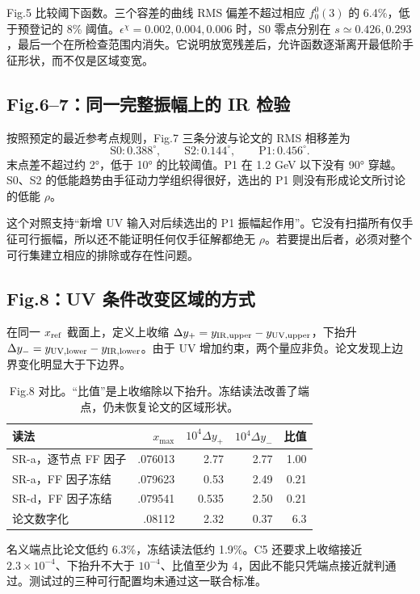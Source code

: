 \documentclass[UTF8,a4paper,11pt,fontset=fandol]{ctexart}
\numberwithin{equation}{section}
\newcommand{\eChi}{\epsilon^{\chi}}
\begin{document}
Fig.5 比较阈下函数。三个容差的曲线 RMS 偏差不超过相应 \(f_0^0(3)\) 的 6.4\%，低于预登记的 8\% 阈值。\(\eChi=0.002,0.004,0.006\) 时，S0 零点分别在 \(s\simeq0.426,0.293\)，最后一个在所检查范围内消失。它说明放宽残差后，允许函数逐渐离开最低阶手征形状，而不仅是区域变宽。

\subsection{Fig.6--7：同一完整振幅上的 IR 检验}
按照预定的最近参考点规则，Fig.7 三条分波与论文的 RMS 相移差为
\begin{equation}
\mathrm{S0}:0.388^\circ,\qquad
\mathrm{S2}:0.144^\circ,\qquad
\mathrm{P1}:0.456^\circ.
\end{equation}
末点差不超过约 2°，低于 10° 的比较阈值。P1 在 1.2 GeV 以下没有 90° 穿越。S0、S2 的低能趋势由手征动力学组织得很好，选出的 P1 则没有形成论文所讨论的低能 \(\rho\)。

这个对照支持“新增 UV 输入对后续选出的 P1 振幅起作用”。它没有扫描所有仅手征可行振幅，所以还不能证明任何仅手征解都绝无 \(\rho\)。若要提出后者，必须对整个可行集建立相应的排除或存在性问题。

\subsection{Fig.8：UV 条件改变区域的方式}
在同一 \(x_{\rm ref}\) 截面上，定义上收缩 \(\Delta y_+=y_{\rm IR,upper}-y_{\rm UV,upper}\)，下抬升 \(\Delta y_-=y_{\rm UV,lower}-y_{\rm IR,lower}\)。由于 UV 增加约束，两个量应非负。论文发现上边界变化明显大于下边界。

\begin{table}[H]\centering\small
\begin{tabularx}{\linewidth}{Yrrrr}
\toprule
读法 & \(x_{\max}\) & \(10^4\Delta y_+\) & \(10^4\Delta y_-\) & 比值\\
\midrule
SR-a，逐节点 FF 因子 & .076013 & 2.77 & 2.77 & 1.00\\
SR-a，FF 因子冻结 & .079623 & 0.53 & 2.49 & 0.21\\
SR-d，FF 因子冻结 & .079541 & 0.535 & 2.50 & 0.21\\
论文数字化 & .08112 & 2.32 & 0.37 & 6.3\\
\bottomrule
\end{tabularx}
\caption{Fig.8 对比。“比值”是上收缩除以下抬升。冻结读法改善了端点，仍未恢复论文的区域形状。}
\end{table}

名义端点比论文低约 6.3\%，冻结读法低约 1.9\%。C5 还要求上收缩接近 \(2.3\times10^{-4}\)、下抬升不大于 \(10^{-4}\)、比值至少为 4，因此不能只凭端点接近就判通过。测试过的三种可行配置均未通过这一联合标准。
\end{document}
